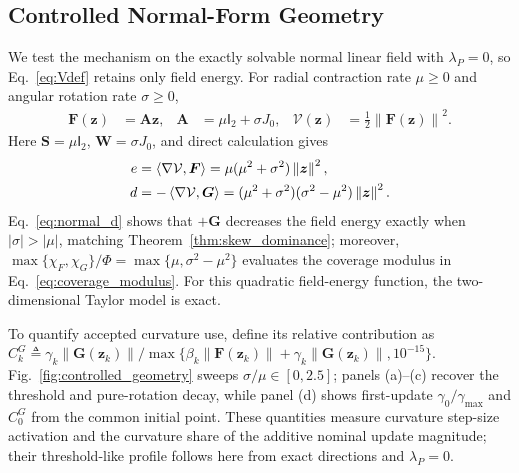 \documentclass[journal]{IEEEtran}
\theoremstyle{remark}
\newcommand{\inner}[2]{\left\langle #1,#2\right\rangle}
\newcommand{\norm}[1]{\left\lVert #1\right\rVert}
\newcommand{\Id}{\mathsf{I}}
\newcommand{\bz}{\boldsymbol{z}}
\newcommand{\bW}{\boldsymbol{W}}
\newcommand{\bS}{\boldsymbol{S}}
\newcommand{\bA}{\boldsymbol{A}}
\newcommand{\bF}{\boldsymbol{F}}
\newcommand{\bG}{\boldsymbol{G}}
\newcommand{\Vk}{\mathcal{V}}
\begin{document}
	\subsection{Controlled Normal-Form Geometry}\label{subsec:controlled_geometry}
	We test the mechanism on the exactly solvable normal linear field with $\lambda_P=0$, so Eq.~\eqref{eq:Vdef} retains only field energy.
	For radial contraction rate $\mu\ge0$ and angular rotation rate $\sigma\ge0$,
	\begin{align*}
		\bF(\bz)&=\bA\bz,
		&\bA&=\mu\Id_2+\sigma J_0,
		&\Vk(\bz)&=\tfrac12\norm{\bF(\bz)}^2.
	\end{align*}
	Here $\bS=\mu\Id_2$, $\bW=\sigma J_0$, and direct calculation gives
	\begin{align}
		e&=\inner{\nabla\Vk}{\bF}
		=\mu(\mu^2+\sigma^2)\norm{\bz}^2,\notag\\
		d&=-\inner{\nabla\Vk}{\bG}
		=(\mu^2+\sigma^2)(\sigma^2-\mu^2)\norm{\bz}^2.\label{eq:normal_d}
	\end{align}
	Eq.~\eqref{eq:normal_d} shows that $+\bG$ decreases the field energy exactly when $|\sigma|>|\mu|$, matching Theorem~\ref{thm:skew_dominance}; moreover, $\max\{\chi_F,\chi_G\}/\Phi=\max\{\mu,\sigma^2-\mu^2\}$ evaluates the coverage modulus in Eq.~\eqref{eq:coverage_modulus}.
	For this quadratic field-energy function, the two-dimensional Taylor model is exact.
	
	To quantify accepted curvature use, define its relative contribution as $C_k^G\triangleq\gamma_k\norm{\bG(\bz_k)}/\max\{\beta_k\norm{\bF(\bz_k)}+\gamma_k\norm{\bG(\bz_k)},10^{-15}\}$.
	Fig.~\ref{fig:controlled_geometry} sweeps $\sigma/\mu\in[0,2.5]$; panels (a)--(c) recover the threshold and pure-rotation decay, while panel (d) shows first-update $\gamma_0/\gamma_{\max}$ and $C_0^G$ from the common initial point.
	These quantities measure curvature step-size activation and the curvature share of the additive nominal update magnitude; their threshold-like profile follows here from exact directions and $\lambda_P=0$.
	
\end{document}
